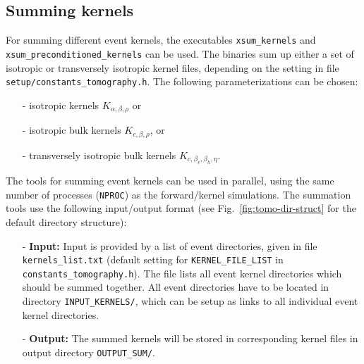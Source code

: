 \subsection{Summing kernels}

For summing different event kernels, the executables \texttt{xsum\_kernels} and \texttt{xsum\_preconditioned\_kernels} can be used.
The binaries sum up either a set of isotropic or transversely isotropic kernel files, depending on the setting in file \texttt{setup/constants\_tomography.h}.
The following parameterizations can be chosen:
\begin{enumerate}
\item [-] isotropic kernels $K_{\alpha,\beta,\rho}$ or
\item [-] isotropic bulk kernels $K_{c,\beta,\rho}$, or
\item [-] transversely isotropic bulk kernels $K_{c,\beta_v,\beta_h,\eta}$.
\end{enumerate}

\noindent
The tools for summing event kernels can be used in parallel, using the same number of processes (\texttt{NPROC}) as the forward/kernel simulations.
The summation tools use the following input/output format (see Fig.~\ref{fig:tomo-dir-struct} for the default directory structure):
\begin{itemize}
\item [-]{\bf Input:}
Input is provided by a list of event directories, given in file \texttt{kernels\_list.txt} (default setting for \texttt{KERNEL\_FILE\_LIST} in \texttt{constants\_tomography.h}). The file lists all event kernel directories which should be summed together. All event directories have to be located in directory \texttt{INPUT\_KERNELS/}, which can be setup as links to all individual event kernel directories.

\item [-]{\bf Output:}
The summed kernels will be stored in corresponding kernel files in output directory \texttt{OUTPUT\_SUM/}.\\
\end{itemize}

